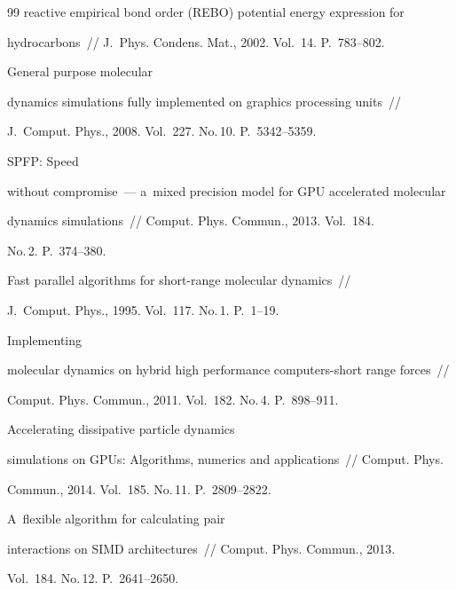 {{{\begin{thebibliography}{99}
reactive empirical bond order (REBO) potential energy expression for 

hydrocarbons~/\!\!/ J.~Phys. Condens. Mat., 2002. Vol.~14. P.~783--802. 


 General purpose molecular 

dynamics simulations fully implemented on graphics processing units~/\!\!/ 

J.~Comput. Phys., 2008. Vol.~227. No.\,10. P.~5342--5359.


 SPFP: Speed 

without compromise~--- a~mixed precision model for GPU accelerated molecular 

dynamics simulations~/\!\!/ Comput. Phys. Commun., 2013. Vol.~184. 

No.\,2. P.~374--380.


 Fast parallel algorithms for short-range molecular dynamics~/\!\!/ 

J.~Comput. Phys., 1995. Vol.~117. No.\,1. P.~1--19.


 Implementing 

molecular dynamics on hybrid high performance computers-short range forces~/\!\!/ 

Comput. Phys. Commun., 2011. Vol.~182. No.\,4. P.~898--911.


 Accelerating dissipative particle dynamics 

simulations on GPUs: Algorithms, numerics and applications~/\!\!/ Comput. Phys. 

Commun., 2014. Vol.~185. No.\,11. P.~2809--2822.


 A~flexible algorithm for calculating pair 

interactions on SIMD architectures~/\!\!/ Comput. Phys. Commun., 2013. 

Vol.~184. No.\,12. P.~2641--2650.


\end{thebibliography}}}}
